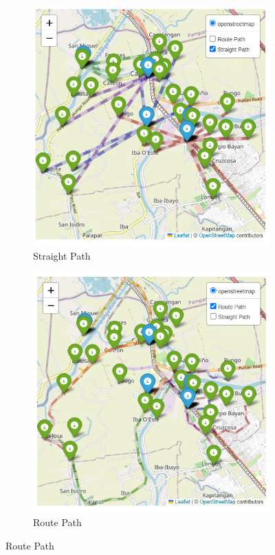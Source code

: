 	\begin{figure}[h!]
		\centering
		\caption{Community to Shelter Paths}
		\begin{subfigure}{0.4\textwidth}
			\centering
			\includegraphics[width=\textwidth]{Chapter 4/straight path}
			\caption{Straight Path}
			\label{straightpath}
		\end{subfigure}
		\hspace{0.5cm}
		\begin{subfigure}{0.4\textwidth}
			\centering
			\includegraphics[width=\textwidth]{Chapter 4/route path}
			\caption{Route Path}
			\label{routepath}
		\end{subfigure}
	\end{figure}
	
